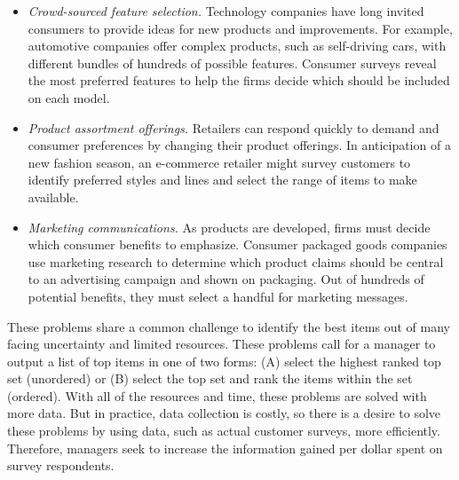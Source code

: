 \documentclass[nonblindrev]{informs3}
\begin{document}
\begin{itemize}
	\item \emph{Crowd-sourced feature selection.} Technology companies have long invited consumers to provide ideas for new products and improvements. For example, automotive companies offer complex products, such as self-driving cars, with different bundles of hundreds of possible features. Consumer surveys reveal the most preferred features to help the firms decide which should be included on each model.
	\item \emph{Product assortment offerings.} Retailers can respond quickly to demand and consumer preferences by changing their product offerings. In anticipation of a new fashion season, an e-commerce retailer might survey customers to identify preferred styles and lines and select the range of items to make available.
	\item \emph{Marketing communications.} As products are developed, firms must decide which consumer benefits to emphasize. Consumer packaged goods companies use marketing research to determine which product claims should be central to an advertising campaign and shown on packaging. Out of hundreds of potential benefits, they must select a handful for marketing messages.
\end{itemize}

These problems share a common challenge to identify the best items out of many facing uncertainty and limited resources. These problems call for a manager to output a list of top items in one of two forms: (A) select the highest ranked top set (unordered) or (B) select the top set and rank the items within the set (ordered). With all of the resources and time, these problems are solved with more data. But in practice, data collection is costly, so there is a desire to solve these problems by using data, such as actual customer surveys, more efficiently.  Therefore, managers seek to increase the information gained per dollar spent on survey respondents. 
\end{document}
